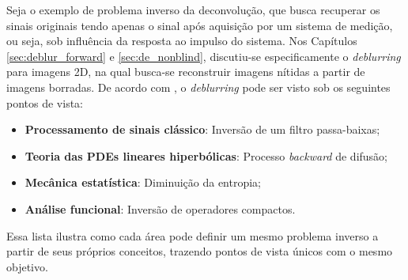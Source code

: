 Seja o exemplo de problema inverso da deconvolução, que busca recuperar os sinais originais tendo apenas o sinal após aquisição por um sistema de medição, ou seja, sob influência da resposta ao impulso do sistema. Nos Capítulos \ref{sec:deblur_forward} e \ref{sec:de_nonblind}, discutiu-se especificamente o \textit{deblurring} para imagens 2D, na qual busca-se reconstruir imagens nítidas a partir de imagens borradas. De acordo com \cite[pág. 216]{Chan2005}, o \textit{deblurring} pode ser visto sob os seguintes pontos de vista:
\begin{itemize}
 \item \textbf{Processamento de sinais clássico}: Inversão de um filtro passa-baixas;
 \item \textbf{Teoria das PDEs lineares hiperbólicas}: Processo \textit{backward} de difusão;
 \item \textbf{Mecânica estatística}: Diminuição da entropia;
 \item \textbf{Análise funcional}: Inversão de operadores compactos.
\end{itemize}
Essa lista ilustra como cada área pode definir um mesmo problema inverso a partir de seus próprios conceitos, trazendo pontos de vista únicos com o mesmo objetivo. 

